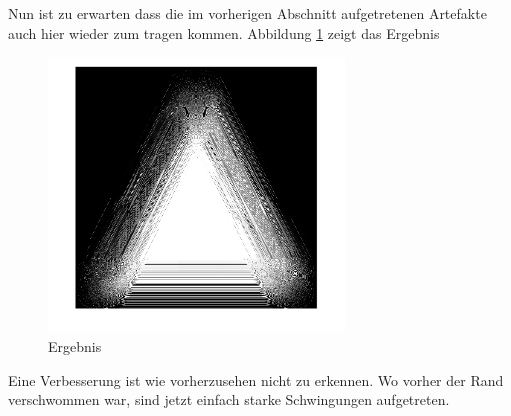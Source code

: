 Nun ist zu erwarten dass die im vorherigen Abschnitt aufgetretenen Artefakte auch hier wieder zum tragen kommen.
Abbildung \ref{deconvolve:ergebnis} zeigt das Ergebnis
\begin{figure}[h]
\centering
\includegraphics[width=0.7\textwidth]{./papers/deconvolve/pictures/dreieck_sharp.png}
\caption{Ergebnis\label{deconvolve:ergebnis}}
\end{figure}
 
Eine Verbesserung ist wie vorherzusehen nicht zu erkennen. Wo vorher der Rand verschwommen war, sind jetzt einfach starke Schwingungen aufgetreten.
